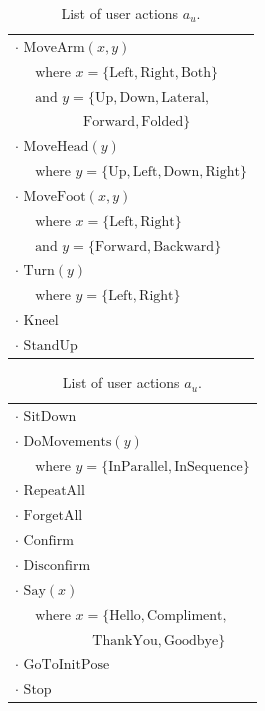 \begin{table}[ht]
\begin{footnotesize}
\begin{tabular}{p{60mm}} 
$\cdot$ $\mathrm{MoveArm}(x,y) $ \\ $ \ \ \ \ \ \text{ where } x=\{\mathrm{Left,Right,Both}\} $ \\ $ \ \ \ \ \  \text{ and } y = \{\mathrm{Up,Down,Lateral,}$ \\ $\ \ \ \ \ \ \ \ \ \  \ \ \ \ \ \ \ \ \ \ \ \ \mathrm{Forward,Folded}\}$ \\
$\cdot$ $\mathrm{MoveHead}(y) $ \\ $\ \ \ \ \  \text{ where } y = \{\mathrm{Up,Left,Down,Right}\}$ \\
$\cdot$ $\mathrm{MoveFoot}(x,y) $ \\ $\ \ \ \ \  \text{ where } x = \{\mathrm{Left,Right}\} $ \\ $\ \ \ \ \ \text{ and } y = \{\mathrm{Forward,Backward}\}$ \\
$\cdot$ $\mathrm{Turn}(y) $ \\ $\ \ \ \ \ \text{ where } y = \{\mathrm{Left,Right}\}$ \\ 
$\cdot$ $\mathrm{Kneel}$ \\
$\cdot$ $\mathrm{StandUp}$ 
\end{tabular}
\hspace{2cm}
\begin{tabular}{p{60mm}} 
$\cdot$ $\mathrm{SitDown}$ \\
$\cdot$ $\mathrm{DoMovements}(y) $ \\ $ \ \ \ \ \  \text{ where } y = \{\mathrm{InParallel,InSequence}\}$\\
$\cdot$ $\mathrm{RepeatAll}$ \\
$\cdot$ $\mathrm{ForgetAll}$ \\
$\cdot$ $\mathrm{Confirm}$ \\
$\cdot$ $\mathrm{Disconfirm}$ \\
$\cdot$ $\mathrm{Say}(x)$ \\  $ \ \ \ \ \  \text{ where } x = \{\mathrm{Hello, Compliment,}$ \\ $\ \ \ \ \ \ \ \ \ \ \ \ \ \ \ \ \ \ \ \ \ \ \ \ \  \mathrm{ThankYou, Goodbye}\}$\\
$\cdot$ $\mathrm{GoToInitPose}$ \\ 
$\cdot$ $\mathrm{Stop}$ 
\end{tabular}
\end{footnotesize}
 \caption{List of user actions $a_u$.} 
\label{table:userdas}
\end{table}

